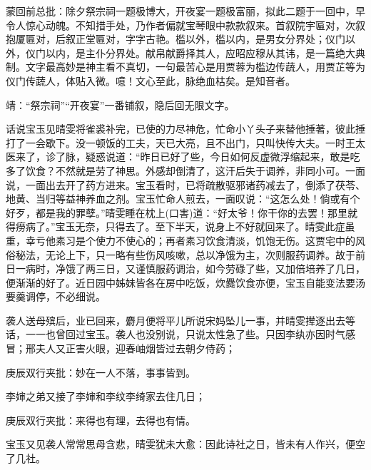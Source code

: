 \begin{parag}

    \begin{note}蒙回前总批：除夕祭宗祠一题极博大，开夜宴一题极富丽，拟此二题于一回中，早令人惊心动魄。不知措手处，乃作者偏就宝琴眼中款款叙来。首叙院宇匾对，次叙抱厦匾对，后叙正堂匾对，字字古艳。槛以外，槛以内，是男女分界处；仪门以外，仪门以内，是主仆分界处。献帛献爵择其人，应昭应穆从其讳，是一篇绝大典制。文字最高妙是神主看不真切，一句最苦心是用贾蓉为槛边传蔬人，用贾芷等为仪门传蔬人，体贴入微。噫！文心至此，脉绝血枯矣。是知音者。\end{note}
\end{parag}


\begin{parag}


    \begin{note}靖：“祭宗祠”“开夜宴”一番铺叙，隐后回无限文字。\end{note}
\end{parag}

\begin{parag}

    话说宝玉见晴雯将雀裘补完，已使的力尽神危，忙命小丫头子来替他捶著，彼此捶打了一会歇下。没一顿饭的工夫，天已大亮，且不出门，只叫快传大夫。一时王太医来了，诊了脉，疑惑说道：“昨日已好了些，今日如何反虚微浮缩起来，敢是吃多了饮食？不然就是劳了神思。外感却倒清了，这汗后失于调养，非同小可。一面说，一面出去开了药方进来。宝玉看时，已将疏散驱邪诸药减去了，倒添了茯苓、地黄、当归等益神养血之剂。宝玉忙命人煎去，一面叹说：“这怎么处！倘或有个好歹，都是我的罪孽。”晴雯睡在枕上(口害)道：“好太爷！你干你的去罢！那里就得痨病了。”宝玉无奈，只得去了。至下半天，说身上不好就回来了。晴雯此症虽重，幸亏他素习是个使力不使心的；再者素习饮食清淡，饥饱无伤。这贾宅中的风俗秘法，无论上下，只一略有些伤风咳嗽，总以净饿为主，次则服药调养。故于前日一病时，净饿了两三日，又谨慎服药调治，如今劳碌了些，又加倍培养了几日，便渐渐的好了。近日园中姊妹皆各在房中吃饭，炊爨饮食亦便，宝玉自能变法要汤要羹调停，不必细说。
\end{parag}


\begin{parag}


    袭人送母殡后，业已回来，麝月便将平儿所说宋妈坠儿一事，并晴雯撵逐出去等话，一一也曾回过宝玉。袭人也没别说，只说太性急了些。只因李纨亦因时气感冒；邢夫人又正害火眼，迎春岫烟皆过去朝夕侍药；\begin{note}庚辰双行夹批：妙在一人不落，事事皆到。\end{note}李婶之弟又接了李婶和李纹李绮家去住几日；\begin{note}庚辰双行夹批：来得也有理，去得也有情。\end{note}宝玉又见袭人常常思母含悲，晴雯犹未大愈：因此诗社之日，皆未有人作兴，便空了几社。
\end{parag}


